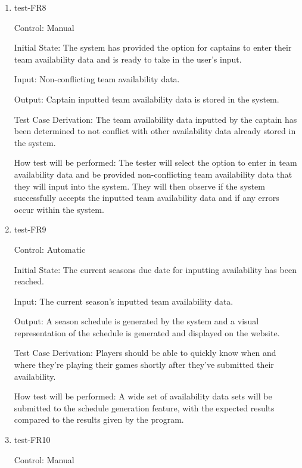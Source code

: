\documentclass[12pt, titlepage]{article}
\begin{document}
\begin{enumerate}

  \item{test-FR8\\}

  Control: Manual
            
  Initial State: The system has provided the option for captains to enter their team
  availability data and is ready to take in the user's input.
            
  Input: Non-conflicting team availability data.
            
  Output: Captain inputted team availability data is stored in the system.

  Test Case Derivation: The team availability data inputted by the captain has been
  determined to not conflict with other availability data already stored in the system.
            
  How test will be performed: The tester will select the option to enter in team 
  availability data and be provided non-conflicting team availability
  data that they will input into the system. They will then observe if the system successfully
  accepts the inputted team availability data and if any errors occur within the system.

  \item{test-FR9\\}

  Control: Automatic
           
  Initial State: The current seasons due date for inputting availability
  has been reached.
           
  Input: The current season's inputted team availability data.
           
  Output: A season schedule is generated by the system and a visual
  representation of the schedule is generated and displayed on the website.
 
  Test Case Derivation: Players should be able to quickly know when and where
  they're playing their games shortly after they've submitted their availability.
 
  How test will be performed: A wide set of availability data sets will be
  submitted to the schedule generation feature, with the expected results
  compared to the results given by the program.

  \item{test-FR10\\}

  Control: Manual


\end{enumerate}
\end{document}
